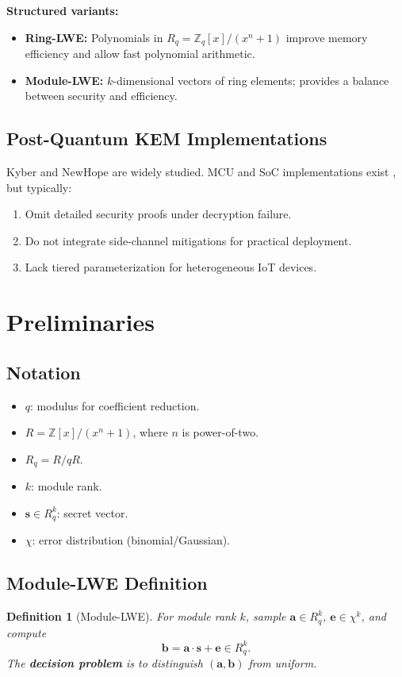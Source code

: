 \documentclass[conference]{IEEEtran}
\newtheorem{definition}{Definition}
\begin{document}
\textbf{Structured variants:}
\begin{itemize}
    \item \textbf{Ring-LWE:} Polynomials in $R_q = \mathbb{Z}_q[x]/(x^n+1)$ improve memory efficiency and allow fast polynomial arithmetic.
    \item \textbf{Module-LWE:} $k$-dimensional vectors of ring elements; provides a balance between security and efficiency.
\end{itemize}

\subsection{Post-Quantum KEM Implementations}
Kyber \cite{NIST} and NewHope \cite{Lyubashevsky10} are widely studied. MCU and SoC implementations exist \cite{Aponte23,PQBench20}, but typically:
\begin{enumerate}
    \item Omit detailed security proofs under decryption failure.
    \item Do not integrate side-channel mitigations for practical deployment.
    \item Lack tiered parameterization for heterogeneous IoT devices.
\end{enumerate}

\section{Preliminaries}
\subsection{Notation}
\begin{itemize}
    \item $q$: modulus for coefficient reduction.
    \item $R = \mathbb{Z}[x]/(x^n+1)$, where $n$ is power-of-two.
    \item $R_q = R/qR$.
    \item $k$: module rank.
    \item $\mathbf{s} \in R_q^k$: secret vector.
    \item $\chi$: error distribution (binomial/Gaussian).
\end{itemize}

\subsection{Module-LWE Definition}
\begin{definition}[Module-LWE]
For module rank $k$, sample $\mathbf{a} \in R_q^k$, $\mathbf{e} \in \chi^k$, and compute
\[
\mathbf{b} = \mathbf{a} \cdot \mathbf{s} + \mathbf{e} \in R_q^k.
\]
The \textbf{decision problem} is to distinguish $(\mathbf{a},\mathbf{b})$ from uniform.
\end{definition}
\end{document}
